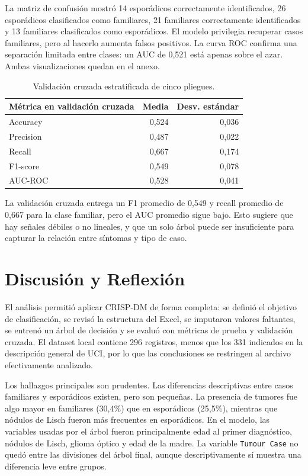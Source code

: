 \documentclass[10pt,a4paper]{article}
\begin{document}
La matriz de confusión mostró 14 esporádicos correctamente identificados, 26 esporádicos clasificados como familiares, 21 familiares correctamente identificados y 13 familiares clasificados como esporádicos. El modelo privilegia recuperar casos familiares, pero al hacerlo aumenta falsos positivos. La curva ROC confirma una separación limitada entre clases: un AUC de 0,521 está apenas sobre el azar. Ambas visualizaciones quedan en el anexo.

\begin{table}[H]
\centering
\small
\begin{tabular}{lrr}
\toprule
Métrica en validación cruzada & Media & Desv. estándar \\
\midrule
Accuracy & 0,524 & 0,036 \\
Precision & 0,487 & 0,022 \\
Recall & 0,667 & 0,174 \\
F1-score & 0,549 & 0,078 \\
AUC-ROC & 0,528 & 0,041 \\
\bottomrule
\end{tabular}
\caption{Validación cruzada estratificada de cinco pliegues.}
\label{tab:cv}
\end{table}

La validación cruzada entrega un F1 promedio de 0,549 y recall promedio de 0,667 para la clase familiar, pero el AUC promedio sigue bajo. Esto sugiere que hay señales débiles o no lineales, y que un solo árbol puede ser insuficiente para capturar la relación entre síntomas y tipo de caso.

\section{Discusión y Reflexión}

El análisis permitió aplicar CRISP-DM de forma completa: se definió el objetivo de clasificación, se revisó la estructura del Excel, se imputaron valores faltantes, se entrenó un árbol de decisión y se evaluó con métricas de prueba y validación cruzada. El dataset local contiene 296 registros, menos que los 331 indicados en la descripción general de UCI, por lo que las conclusiones se restringen al archivo efectivamente analizado.

Los hallazgos principales son prudentes. Las diferencias descriptivas entre casos familiares y esporádicos existen, pero son pequeñas. La presencia de tumores fue algo mayor en familiares (30,4\%) que en esporádicos (25,5\%), mientras que nódulos de Lisch fueron más frecuentes en esporádicos. En el modelo, las variables usadas por el árbol fueron principalmente edad al primer diagnóstico, nódulos de Lisch, glioma óptico y edad de la madre. La variable \texttt{Tumour Case} no quedó entre las divisiones del árbol final, aunque descriptivamente sí muestra una diferencia leve entre grupos.
\end{document}
